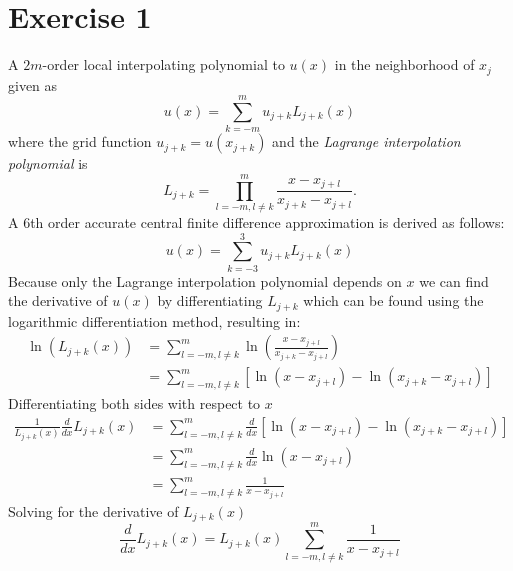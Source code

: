 \section*{Exercise 1}
A $2m$-order local interpolating polynomial to $u(x)$ in the neighborhood of $x_j$ given as
\begin{equation}
	u(x) = \sum_{k=-m}^m u_{j+k} L_{j+k}(x)
	\label{eq:interp_poly}
\end{equation}
where the grid function $u_{j+k} = u(x_{j+k})$ and the \textit{Lagrange interpolation polynomial} is
\begin{equation}
	L_{j+k} = \prod_{l=-m, l \neq k}^m \frac{x - x_{j+l}}{x_{j+k} - x_{j+l}}.
	\label{eq:lagrange_interpoly}
\end{equation}
A 6th order accurate central finite difference approximation is derived as follows:
\begin{equation}
	u(x) = \sum_{k=-3}^3 u_{j+k} L_{j+k}(x)
	\label{eq:6order}
\end{equation}
Because only the Lagrange interpolation polynomial depends on $x$ we can find the derivative of $u(x)$ by differentiating $L_{j+k}$ which can be found using the logarithmic differentiation method, resulting in:
\begin{equation}
	\begin{aligned}
		\ln(L_{j+k}(x)) & = \sum_{l=-m, l \neq k}^m \ln\left(\frac{x - x_{j+l}}{x_{j+k} - x_{j+l}}\right)  \\
		                & = \sum_{l=-m, l \neq k}^m \left[\ln(x - x_{j+l}) - \ln(x_{j+k} - x_{j+l})\right]
	\end{aligned}
\end{equation}
Differentiating both sides with respect to $x$
\begin{equation}
	\begin{aligned}
		\frac{1}{L_{j+k}(x)}\frac{d}{dx}L_{j+k}(x) & = \sum_{l=-m, l \neq k}^m \frac{d}{dx}\left[\ln(x - x_{j+l}) - \ln(x_{j+k} - x_{j+l})\right] \\
		                                           & = \sum_{l=-m, l \neq k}^m \frac{d}{dx}\ln(x - x_{j+l})                                       \\
		                                           & = \sum_{l=-m, l \neq k}^m \frac{1}{x - x_{j+l}}
	\end{aligned}
\end{equation}
Solving for the derivative of $L_{j+k}(x)$
\begin{equation}
	\frac{d}{dx}L_{j+k}(x)  = L_{j+k}(x) \sum_{l=-m, l \neq k}^m \frac{1}{x - x_{j+l}}
\end{equation}
